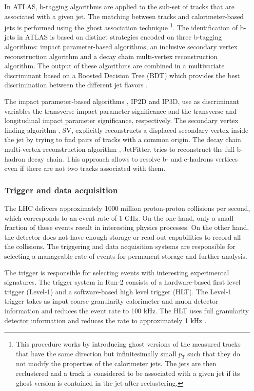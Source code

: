 In ATLAS, b-tagging algorithms are applied to the sub-set of tracks that are associated with a given jet. The matching between tracks and calorimeter-based jets is performed using the ghost association technique \cite{GhostAssociation}\footnote{This procedure works by introducing ghost versions of the measured tracks that have the same direction but infinitesimally small $p_T$ such that they do not modify the properties of the calorimeter jets. The jets are then reclustered and a track is considered to be associated with a given jet if its ghost version is contained in the jet after reclustering.}. The identification of b-jets in ATLAS is based on distinct strategies encoded on three b-tagging algorithms: impact parameter-based algorithms, an inclusive secondary vertex reconstruction algorithm and  a decay chain multi-vertex reconstruction algorithm. The output of these algorithms are combined in a multivariate discriminant based on a Boosted Decision Tree (BDT) which provides the best discrimination between the different jet flavors \cite{btagATLAS}.

The impact parameter-based algorithms \cite{ATLASbtag}, IP2D and IP3D, use as discriminant variables the transverse impact parameter significance and the transverse and longitudinal impact parameter significance, respectively. The secondary vertex finding algorithm \cite{ATLASbtag}, SV, explicitly reconstructs a displaced secondary vertex inside the jet by trying to find pairs of tracks with a common origin. The decay chain multi-vertex reconstruction algorithm \cite{ATLASbtag1}, JetFitter, tries to reconstruct the full b-hadron decay chain. This approach allows to resolve b- and c-hadrons vertices even if there are not two tracks associated with them.

\subsubsection{Trigger and data acquisition}

The LHC delivers approximately 1000 million proton-proton collisions per second, which corresponds to an event rate of 1 GHz. On the one hand, only a small fraction of these events result in interesting physics processes. On the other hand, the detector does not have enough storage or read out capabilities to record all the collisions. The triggering and data acquisition systems are responsible for selecting a manageable rate of events for permanent storage and further analysis. 

The trigger is responsible for selecting events with interesting experimental signatures. The trigger system in Run-2 consists of a hardware-based first  level  trigger (Level-1) and a software-based high level trigger (HLT). The Level-1 trigger takes as input  coarse  granularity calorimeter and muon detector information and reduces the event rate to 100 kHz. The HLT uses full granularity detector information and reduces the rate to approximately 1 kHz \cite{run2trigger}.    

